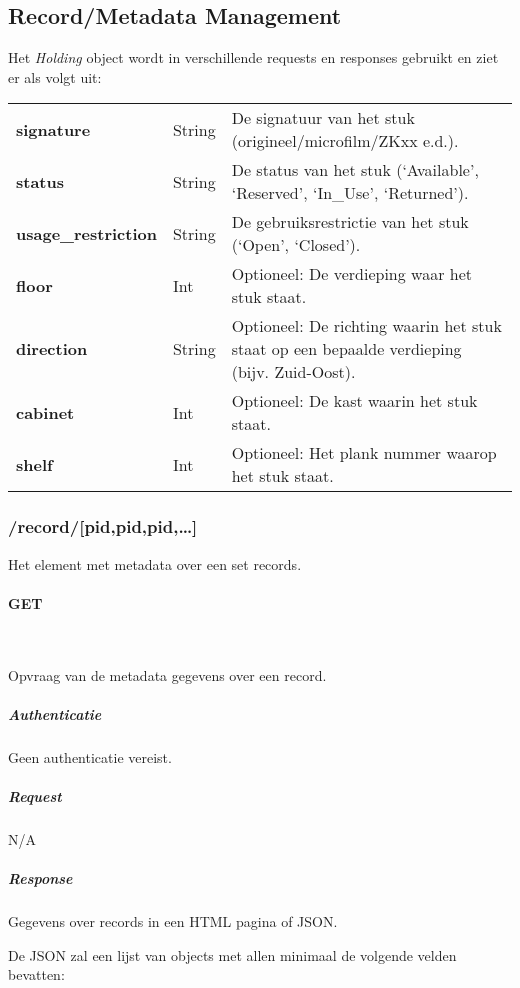 \documentclass[a4paper,titlepage]{report}
\makeatletter
\def\namedlabel#1#2{
  \label{#1}
  \begingroup
   \def\@currentlabel{#2}%
   \label{#1:name}\endgroup
}
\makeatother
\begin{document}
    \subsection{Record/Metadata Management}
      Het \emph{Holding} object wordt in verschillende requests en responses
      gebruikt en ziet er als volgt uit:\hfill\\
      \begin{tabular}{l l p{13cm}}
        \textbf{signature} & String & De signatuur van het stuk
        (origineel/microfilm/ZKxx e.d.).\\ 
        \textbf{status} & String & De status van het stuk (`Available',
        `Reserved', `In\_Use', `Returned').\\
        \textbf{usage\_restriction} & String & De gebruiksrestrictie van het
        stuk (`Open', `Closed').\\
        \textbf{floor} & Int & Optioneel: De verdieping waar het stuk staat.\\
        \textbf{direction} & String & Optioneel: De richting waarin het stuk staat op een
        bepaalde verdieping (bijv. Zuid-Oost).\\
        \textbf{cabinet} & Int & Optioneel: De kast waarin het stuk staat.\\
        \textbf{shelf} & Int & Optioneel: Het plank nummer waarop het stuk staat.\\
      \end{tabular}

      \subsubsection{/record/[pid,pid,pid,\ldots]}
        Het element met metadata over een set records.

        \paragraph{GET}\hfill\\
          \namedlabel{api:record:get}{GET /record/[pid,pid,pid,\ldots]}
          Opvraag van de metadata gegevens over een record.

          \subparagraph{Authenticatie}
            Geen authenticatie vereist.

          \subparagraph{Request} N/A

          \subparagraph{Response}
            Gegevens over records in een HTML pagina of JSON.

            De JSON zal een lijst van objects met allen minimaal de volgende
            velden bevatten:\\
\end{document}
